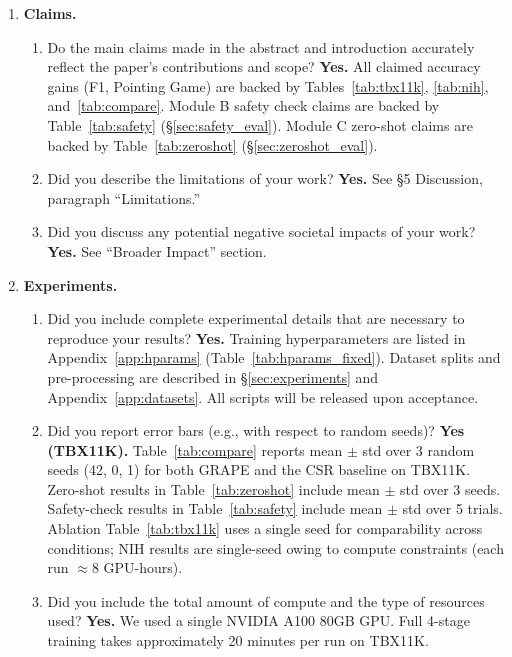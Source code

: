 \documentclass{article}
\begin{document}
\begin{enumerate}

\item \textbf{Claims.}
\begin{enumerate}
  \item Do the main claims made in the abstract and introduction accurately reflect the paper's contributions and scope? \textbf{Yes.} All claimed accuracy gains (F1, Pointing Game) are backed by Tables~\ref{tab:tbx11k}, \ref{tab:nih}, and~\ref{tab:compare}. Module B safety check claims are backed by Table~\ref{tab:safety} (§\ref{sec:safety_eval}). Module C zero-shot claims are backed by Table~\ref{tab:zeroshot} (§\ref{sec:zeroshot_eval}).
  \item Did you describe the limitations of your work? \textbf{Yes.} See §5 Discussion, paragraph ``Limitations.''
  \item Did you discuss any potential negative societal impacts of your work? \textbf{Yes.} See ``Broader Impact'' section.
\end{enumerate}

\item \textbf{Experiments.}
\begin{enumerate}
  \item Did you include complete experimental details that are necessary to reproduce your results? \textbf{Yes.} Training hyperparameters are listed in Appendix~\ref{app:hparams} (Table~\ref{tab:hparams_fixed}). Dataset splits and pre-processing are described in §\ref{sec:experiments} and Appendix~\ref{app:datasets}. All scripts will be released upon acceptance.
  \item Did you report error bars (e.g., with respect to random seeds)? \textbf{Yes (TBX11K).} Table~\ref{tab:compare} reports mean $\pm$ std over 3 random seeds (42, 0, 1) for both GRAPE and the CSR baseline on TBX11K. Zero-shot results in Table~\ref{tab:zeroshot} include mean $\pm$ std over 3 seeds. Safety-check results in Table~\ref{tab:safety} include mean $\pm$ std over 5 trials. Ablation Table~\ref{tab:tbx11k} uses a single seed for comparability across conditions; NIH results are single-seed owing to compute constraints (each run $\approx$8 GPU-hours).
  \item Did you include the total amount of compute and the type of resources used? \textbf{Yes.} We used a single NVIDIA A100 80GB GPU. Full 4-stage training takes approximately 20 minutes per run on TBX11K.
\end{enumerate}


\end{enumerate}
\end{document}
